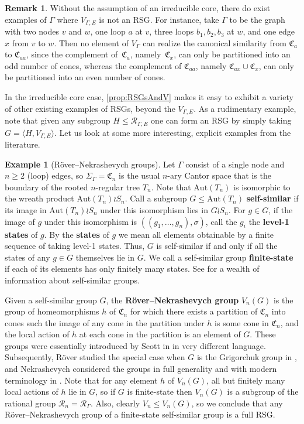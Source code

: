 \documentclass[11pt,letterpaper]{amsart}
\theoremstyle{definition}
\newtheorem{remark}[theorem]{Remark}
\newtheorem{example}[theorem]{Example}
\newcommand{\newword}[1]{\textbf{#1}}
\newcommand{\R}{\mathcal{R}}
\newcommand{\C}{\mathfrak{C}}
\newcommand{\Aut}{\mathrm{Aut}}
\begin{document}
\begin{remark}
Without the assumption of an irreducible core, there do exist examples of $\Gamma$ where $V_{\Gamma,E}$ is not an RSG. For instance, take $\Gamma$ to be the graph with two nodes $v$ and $w$, one loop $a$ at $v$, three loops $b_1,b_2,b_3$ at $w$, and one edge $x$ from $v$ to $w$. Then no element of $V_\Gamma$ can realize the canonical similarity from $\C_a$ to $\C_{aa}$, since the complement of~$\C_a$, namely~$\C_x$, can only be partitioned into an odd number of cones, whereas the complement of $\C_{aa}$, namely $\C_{ax}\cup\C_x$, can only be partitioned into an even number of cones.
\end{remark}
In the irreducible core case, \cref{prop:RSGsAndV} makes it easy to exhibit a variety of other existing examples of RSGs, beyond the $V_{\Gamma,E}$. As a rudimentary example, note that given any subgroup $H\le \R_{\Gamma,E}$ one can form an RSG by simply taking $G=\langle H,V_{\Gamma,E}\rangle$. Let us look at some more interesting, explicit examples from the literature.

\begin{example}[R\"over--Nekrashevych groups]\label{ex:rn}
Let $\Gamma$ consist of a single node and $n\ge 2$ (loop) edges, so $\Sigma_\Gamma=\C_n$ is the usual $n$-ary Cantor space that is the boundary of the rooted $n$-regular tree $T_n$. Note that $\Aut(T_n)$ is isomorphic to the wreath product $\Aut(T_n)\wr S_n$. Call a subgroup $G\le \Aut(T_n)$ \newword{self-similar} if its image in $\Aut(T_n)\wr S_n$ under this isomorphism lies in $G \wr S_n$. For $g\in G$, if the image of $g$ under this isomorphism is $((g_1,\dots,g_n),\sigma)$, call the $g_i$ the \newword{level-1 states} of $g$. By the \newword{states} of $g$ we mean all elements obtainable by a finite sequence of taking level-1 states. Thus, $G$ is self-similar if and only if all the states of any $g\in G$ themselves lie in $G$. We call a self-similar group \newword{finite-state} if each of its elements has only finitely many states. See \cite{Nekrashevych-book} for a wealth of information about self-similar groups.

Given a self-similar group $G$, the \newword{R\"over--Nekrashevych group} $V_n(G)$ is the group of homeomorphisms $h$ of $\C_n$ for which there exists a partition of $\C_n$ into cones such the image of any cone in the partition under $h$ is some cone in $\C_n$, and the local action of $h$ at each cone in the partition is an element of $G$. These groups were essentially introduced by Scott in \cite{scott84} in very different language. Subsequently, R\"over studied the special case when $G$ is the Grigorchuk group in \cite{roever99}, and Nekrashevych considered the groups in full generality and with modern terminology in \cite{nekrashevych04}. Note that for any element $h$ of $V_n(G)$, all but finitely many local actions of $h$ lie in $G$, so if $G$ is finite-state then $V_n(G)$ is a subgroup of the rational group $\R_n=\R_{\Gamma}$. Also, clearly $V_n\le V_n(G)$, so we conclude that any R\"over--Nekrashevych group of a finite-state self-similar group is a full RSG.
\end{example}
\end{document}
